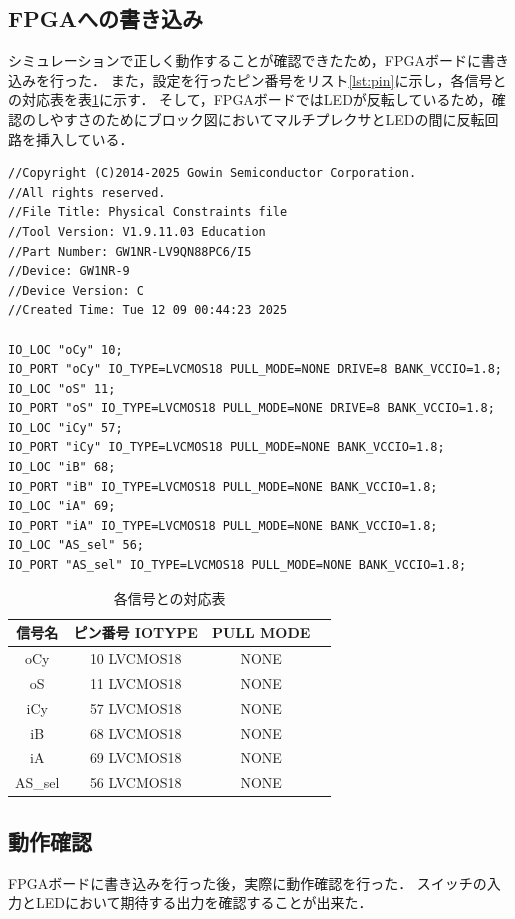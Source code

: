 \documentclass[a4paper,11pt]{ltjsarticle}
\begin{document}
\subsection{FPGAへの書き込み}
シミュレーションで正しく動作することが確認できたため，FPGAボードに書き込みを行った．
また，設定を行ったピン番号をリスト\ref{lst:pin}に示し，各信号との対応表を表\ref{tab:pin}に示す．
そして，FPGAボードではLEDが反転しているため，確認のしやすさのためにブロック図においてマルチプレクサとLEDの間に反転回路を挿入している．
\begin{lstlisting}[caption=FPGAピン設定コード,label=lst:pin]
//Copyright (C)2014-2025 Gowin Semiconductor Corporation.
//All rights reserved. 
//File Title: Physical Constraints file
//Tool Version: V1.9.11.03 Education
//Part Number: GW1NR-LV9QN88PC6/I5
//Device: GW1NR-9
//Device Version: C
//Created Time: Tue 12 09 00:44:23 2025

IO_LOC "oCy" 10;
IO_PORT "oCy" IO_TYPE=LVCMOS18 PULL_MODE=NONE DRIVE=8 BANK_VCCIO=1.8;
IO_LOC "oS" 11;
IO_PORT "oS" IO_TYPE=LVCMOS18 PULL_MODE=NONE DRIVE=8 BANK_VCCIO=1.8;
IO_LOC "iCy" 57;
IO_PORT "iCy" IO_TYPE=LVCMOS18 PULL_MODE=NONE BANK_VCCIO=1.8;
IO_LOC "iB" 68;
IO_PORT "iB" IO_TYPE=LVCMOS18 PULL_MODE=NONE BANK_VCCIO=1.8;
IO_LOC "iA" 69;
IO_PORT "iA" IO_TYPE=LVCMOS18 PULL_MODE=NONE BANK_VCCIO=1.8;
IO_LOC "AS_sel" 56;
IO_PORT "AS_sel" IO_TYPE=LVCMOS18 PULL_MODE=NONE BANK_VCCIO=1.8;
\end{lstlisting}
\begin{table}[H]
  \centering
  \caption{各信号との対応表}
  \label{tab:pin}
  \begin{tabular}{|c|c|c|c|}
    \hline
    信号名     & ピン番号 IOTYPE & PULL MODE \\
    \hline
    oCy     & 10 LVCMOS18 & NONE      \\
    \hline
    oS      & 11 LVCMOS18 & NONE      \\
    \hline
    iCy     & 57 LVCMOS18 & NONE      \\
    \hline
    iB      & 68 LVCMOS18 & NONE      \\
    \hline
    iA      & 69 LVCMOS18 & NONE      \\
    \hline
    AS\_sel & 56 LVCMOS18 & NONE      \\
    \hline
  \end{tabular}
\end{table}
\subsection{動作確認}
FPGAボードに書き込みを行った後，実際に動作確認を行った．
スイッチの入力とLEDにおいて期待する出力を確認することが出来た．
\end{document}
